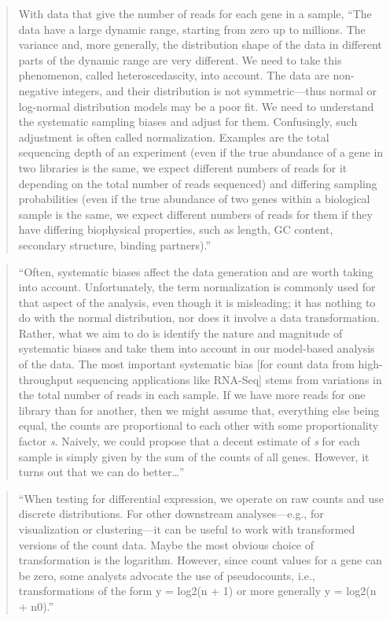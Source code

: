 \documentclass[]{tufte-book}
\begin{document}
\begin{quote}
With data that give the number of reads for each gene in a sample, ``The
data have a large dynamic range, starting from zero up to millions. The
variance and, more generally, the distribution shape of the data in different
parts of the dynamic range are very different. We need to take this
phenomenon, called heteroscedascity, into account. The data are non-negative
integers, and their distribution is not symmetric---thus normal or log-normal
distribution models may be a poor fit. We need to understand the systematic
sampling biases and adjust for them. Confusingly, such adjustment is often
called normalization. Examples are the total sequencing depth of an experiment
(even if the true abundance of a gene in two libraries is the same, we expect
different numbers of reads for it depending on the total number of reads
sequenced) and differing sampling probabilities (even if the true abundance of
two genes within a biological sample is the same, we expect different numbers
of reads for them if they have differing biophysical properties, such as length,
GC content, secondary structure, binding partners).'' \citep{holmes2018modern}
\end{quote}

\begin{quote}
``Often, systematic biases affect the data generation and are worth taking
into account. Unfortunately, the term normalization is commonly used for that
aspect of the analysis, even though it is misleading; it has nothing to do
with the normal distribution, nor does it involve a data transformation.
Rather, what we aim to do is identify the nature and magnitude of
systematic biases and take them into account in our model-based analysis of the
data. The most important systematic bias {[}for count data from high-throughput
sequencing applications like RNA-Seq{]} stems from variations in the total number
of reads in each sample. If we have more reads for one library than for another,
then we might assume that, everything else being equal, the counts are
proportional to each other with some proportionality factor \emph{s}. Naively,
we could propose that a decent estimate of \emph{s} for each sample is simply
given by the sum of the counts of all genes. However, it turns out that we
can do better\ldots{}'' \citep{holmes2018modern}
\end{quote}

\begin{quote}
``When testing for differential expression, we operate on raw counts and
use discrete distributions. For other downstream analyses---e.g., for
visualization or clustering---it can be useful to work with transformed versions
of the count data. Maybe the most obvious choice of transformation is the
logarithm. However, since count values for a gene can be zero, some analysts
advocate the use of pseudocounts, i.e., transformations of the form
y = log2(n + 1) or more generally y = log2(n + n0).'' \citep{holmes2018modern}
\end{quote}
\end{document}
